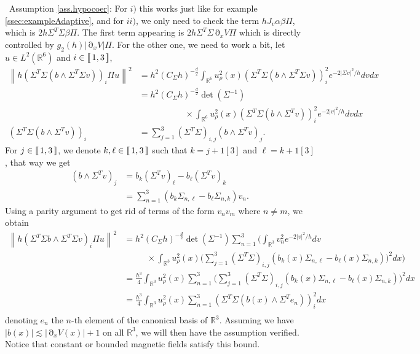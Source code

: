 \documentclass[12pt]{amsart}
\newcommand{\R}{\mathbb R}
\numberwithin{equation}{section}
\numberwithin{figure}{section}
\DeclareMathOperator{\p}{\partial}
\newcommand{\vvert}[1]{\left\lVert#1\right\rVert}
\newcommand{\lb}{\operatorname{[\negthinspace [}}
\newcommand{\rb}{\operatorname{]\negthinspace ]}}
\begin{document}
\textbullet\ Assumption \ref{ass.hypocoer}: For $i)$ this works just like for example \ref{ssec:exampleAdaptive}, and for $ii)$, we only need to check the term $hJ_v\alpha\beta\Pi$, which is $2h\Sigma^T\Sigma\beta\Pi$. The first term appearing is $2h\Sigma^T\Sigma\p_xV\Pi$ which is directly controlled by $g_2(h)|\p_xV|\Pi$. For the other one, we need to work a bit, let $u\in L^2(\R^6)$ and $i\in\lb1,3\rb$,
\begin{equation*}
\begin{aligned}
    \vvert{h(\Sigma^T\Sigma (b\wedge\Sigma^T\Sigma v))_i\Pi u}^2 &= h^2(C_\Sigma h)^{-\frac d2}\int_{\R^6}u_\rho^2(x)(\Sigma^T\Sigma (b\wedge\Sigma^T\Sigma v))_i^2e^{-2|\Sigma v|^2/h}dvdx\\
    &= h^2(C_\Sigma h)^{-\frac d2}\det(\Sigma^{-1})\\
    &\phantom{********}\times\int_{\R^6}u_\rho^2(x)(\Sigma^T\Sigma (b\wedge\Sigma^T v))_i^2e^{-2|v|^2/h}dvdx\\
    (\Sigma^T\Sigma (b\wedge\Sigma^T v))_i &= \sum_{j=1}^3(\Sigma^T\Sigma)_{i,j}(b\wedge\Sigma^T v)_j.
\end{aligned}
\end{equation*}
For $j\in\lb1,3\rb$, we denote $k,\ell\in\lb1,3\rb$ such that $k=j+1[3]$ and $\ell=k+1[3]$, that way we get
\begin{equation*}
\begin{aligned}
    (b\wedge\Sigma^T v)_j &= b_k(\Sigma^T v)_\ell - b_\ell(\Sigma^T v)_k\\
    &= \sum_{n=1}^3(b_k\Sigma_{n,\ell} - b_\ell\Sigma_{n,k})v_n.
\end{aligned}
\end{equation*}
Using a parity argument to get rid of terms of the form $v_nv_m$ where $n\neq m$, we obtain
\begin{equation*}
\begin{aligned}
    \vvert{h(\Sigma^T\Sigma b\wedge\Sigma^T\Sigma v)_i\Pi u}^2 &=h^2(C_\Sigma h)^{-\frac d2}\det(\Sigma^{-1})\sum_{n=1}^3\Bigg(\int_{\R^3}v_n^2e^{-2|v|^2/h}dv\\
    &\phantom{****}\times\int_{\R^3}u_\rho^2(x)\Big(\sum_{j=1}^3(\Sigma^T\Sigma)_{i,j}(b_k(x)\Sigma_{n,\ell} - b_\ell(x)\Sigma_{n,k})\Big)^2dx\Bigg)\\
    &= \frac{h^3}{4}\int_{\R^3}u_\rho^2(x)\sum_{n=1}^3\Big(\sum_{j=1}^3(\Sigma^T\Sigma)_{i,j}(b_k(x)\Sigma_{n,\ell} - b_\ell(x)\Sigma_{n,k})\Big)^2dx\\
    &= \frac{h^3}{4}\int_{\R^3}u_\rho^2(x)\sum_{n=1}^3(\Sigma^T\Sigma (b(x)\wedge\Sigma^T e_n))_i^2dx\\
\end{aligned}
\end{equation*}
denoting $e_n$ the $n$-th element of the canonical basis of $\R^3$. Assuming we have $|b(x)| \lesssim |\p_xV(x)| + 1$ on all $\R^3$, we will then have the assumption verified. Notice that constant or bounded magnetic fields satisfy this bound.
\end{document}
